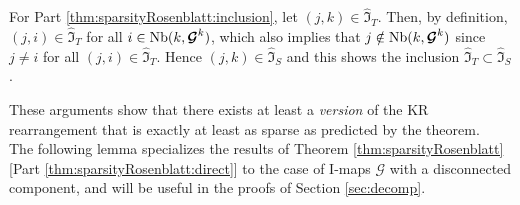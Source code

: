 \documentclass[twoside,11pt]{article}
\newcommand{\Gcb}{\boldsymbol{\mathcal{G}}}
\newcommand{\sparse}{ \mathfrak{I} }
\newcommand{\neigh}{ {\rm Nb} }
\begin{document}
%
%
%

%
%
%
%
%
%
%
%
%
%
%
%
%
%
%
%
%
%
%
%
%
%
%
%
%
%
%
%
%
%

For Part \ref{thm:sparsityRosenblatt:inclusion}, let $(j,k)\in \widehat{\sparse}_T$. 
Then, by definition, 
$(j,i) \in \widehat{\sparse}_T$ for all $i \in \neigh (k, \Gcb^k)$,
which also implies that $j \notin \neigh (k, \Gcb^k)$ since
$j \neq i$ for all $(j,i)\in \widehat{\sparse}_T$. 
Hence $(j,k)\in \widehat{\sparse}_S$ and this shows the inclusion
$\widehat{\sparse}_T \subset \widehat{\sparse}_S$.

These arguments show that there exists at least a {\it version} of the
KR rearrangement that is exactly at least as sparse as predicted by the theorem.
\hfill\BlackBox\\[2mm]

The following lemma specializes the results of Theorem 
\ref{thm:sparsityRosenblatt}[Part \ref{thm:sparsityRosenblatt:direct}]
to the case of I-maps $\Gcb$ with a disconnected component, and will be
useful in the proofs of Section \ref{sec:decomp}.
\end{document}
